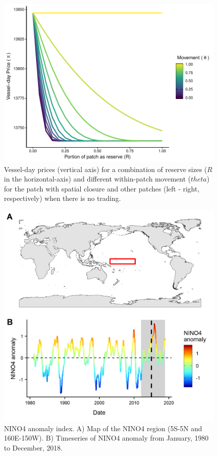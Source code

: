 \documentclass[12pt]{article}
\begin{document}
\begin{figure}
\centering
\includegraphics{img/vessel_day_price_with_trading_plot.pdf}
\caption{\label{fig:vessel_day_price_with_trading_plot}Vessel-day prices (vertical axis) for a combination of reserve sizes ($R$ in the horizontal-axis) and different within-patch movement ($theta$) for the patch with spatial closure and other patches (left - right, respectively) when there is no trading.}
\end{figure}

\begin{figure}
\centering
\includegraphics{img/nino_plot.png}
\caption{\label{fig:nino_plot}NINO4 anomaly index. A) Map of the NINO4 region (5S-5N and 160E-150W). B) Timeseries of NINO4 anomaly from January, 1980 to December, 2018.}
\end{figure}
\end{document}
